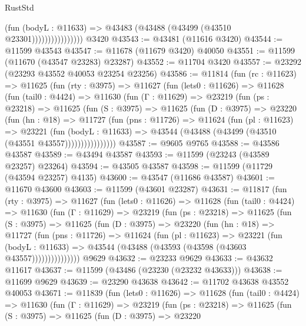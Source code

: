 \begin{lexlean}{RustStd}
\begin{coremodule}
                            (fun (bodyL : @11633) =>
                            @43483 (@43488 (@43499 (@43510 @23301))))))))))))))))
    @3420
@43543 := @43481 (@11616 @3420)
@43544 := @11599 @43543
@43547 := @11678 (@11679 @3420) @40050
@43551 := @11599 (@11670 (@43547 @23283) @23287)
@43552 := @11704 @3420
@43557 := @23292 (@23293 @43552 @40053 @23254 @23256)
@43586 := @11814
    (fun (rc : @11623) =>
    @11625
      (fun (rty : @3975) =>
      @11627
        (fun (lets0 : @11626) =>
        @11628
          (fun (tail0 : @4424) =>
          @11630
            (fun (Γ : @11629) =>
            @23219
              (fun (ps : @23218) =>
              @11625
                (fun (S : @3975) =>
                @11625
                  (fun (D : @3975) =>
                  @23220
                    (fun (hn : @18) =>
                    @11727
                      (fun (pns : @11726) =>
                      @11624
                        (fun (pl : @11623) =>
                        @23221
                          (fun (bodyL : @11633) =>
                          @43544 (@43488 (@43499 (@43510 (@43551 @43557))))))))))))))))
@43587 := @9605 @9765
@43588 := @43586 @43587
@43589 := @43494 @43587
@43593 := @11599 (@23243 (@43589 @23257) @23264)
@43594 := @43505 @43587
@43598 := @11599 (@11729 (@43594 @23257) @4135)
@43600 := @43547 (@11686 @43587)
@43601 := @11670 @43600
@43603 := @11599 (@43601 @23287)
@43631 := @11817
    (fun (rty : @3975) =>
    @11627
      (fun (lets0 : @11626) =>
      @11628
        (fun (tail0 : @4424) =>
        @11630
          (fun (Γ : @11629) =>
          @23219
            (fun (ps : @23218) =>
            @11625
              (fun (S : @3975) =>
              @11625
                (fun (D : @3975) =>
                @23220
                  (fun (hn : @18) =>
                  @11727
                    (fun (pns : @11726) =>
                    @11624
                      (fun (pl : @11623) =>
                      @23221
                        (fun (bodyL : @11633) =>
                        @43544 (@43488 (@43593 (@43598 (@43603 @43557)))))))))))))))
    @9629
@43632 := @23233 @9629
@43633 := @43632 @11617
@43637 := @11599 (@43486 (@23230 (@23232 @43633)))
@43638 := @11699 @9629
@43639 := @23290 @43638
@43642 := @11702 @43638 @43552 @40053
@43671 := @11839
    (fun (lets0 : @11626) =>
    @11628
      (fun (tail0 : @4424) =>
      @11630
        (fun (Γ : @11629) =>
        @23219
          (fun (ps : @23218) =>
          @11625
            (fun (S : @3975) =>
            @11625
              (fun (D : @3975) =>
              @23220

\end{coremodule}
\end{lexlean}
